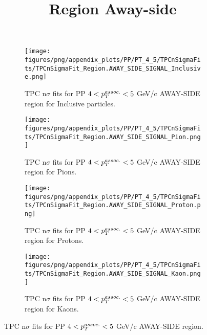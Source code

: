             \begin{figure}[H]
                \title{Region Away-side}
                \begin{subfigure}[b]{0.5\textwidth}
                    \centering
                    \texttt{[image: figures/png/appendix\_plots/PP/PT\_4\_5/TPCnSigmaFits/TPCnSigmaFit\_Region.AWAY\_SIDE\_SIGNAL\_Inclusive.png]}
                    \caption{TPC n$\sigma$ fits for PP $4 < \pTassoc < 5$ GeV/c AWAY-SIDE region for Inclusive particles.}
                    \label{fig:appendix_PP_$4 < \pTassoc < 5$ GeV/c_AWAY_SIDE_SIGNAL_Inclusive}
                \end{subfigure}
                \begin{subfigure}[b]{0.5\textwidth}
                    \centering
                    \texttt{[image: figures/png/appendix\_plots/PP/PT\_4\_5/TPCnSigmaFits/TPCnSigmaFit\_Region.AWAY\_SIDE\_SIGNAL\_Pion.png]}
                    \caption{TPC n$\sigma$ fits for PP $4 < \pTassoc < 5$ GeV/c AWAY-SIDE region for Pions.}
                    \label{fig:appendix_PP_$4 < \pTassoc < 5$ GeV/c_AWAY_SIDE_SIGNAL_Pion}
                \end{subfigure}
                \begin{subfigure}[b]{0.5\textwidth}
                    \centering
                    \texttt{[image: figures/png/appendix\_plots/PP/PT\_4\_5/TPCnSigmaFits/TPCnSigmaFit\_Region.AWAY\_SIDE\_SIGNAL\_Proton.png]}
                    \caption{TPC n$\sigma$ fits for PP $4 < \pTassoc < 5$ GeV/c AWAY-SIDE region for Protons.}
                    \label{fig:appendix_PP_$4 < \pTassoc < 5$ GeV/c_AWAY_SIDE_SIGNAL_Proton}
                \end{subfigure}
                \begin{subfigure}[b]{0.5\textwidth}
                    \centering
                    \texttt{[image: figures/png/appendix\_plots/PP/PT\_4\_5/TPCnSigmaFits/TPCnSigmaFit\_Region.AWAY\_SIDE\_SIGNAL\_Kaon.png]}
                    \caption{TPC n$\sigma$ fits for PP $4 < \pTassoc < 5$ GeV/c AWAY-SIDE region for Kaons.}
                    \label{fig:appendix_PP_$4 < \pTassoc < 5$ GeV/c_AWAY_SIDE_SIGNAL_Kaon}
                \end{subfigure}
                \caption{TPC n$\sigma$ fits for PP $4 < \pTassoc < 5$ GeV/c AWAY-SIDE region.}
                \label{fig:appendix_PP_$4 < \pTassoc < 5$ GeV/c_AWAY_SIDE_SIGNAL}
            \end{figure}
